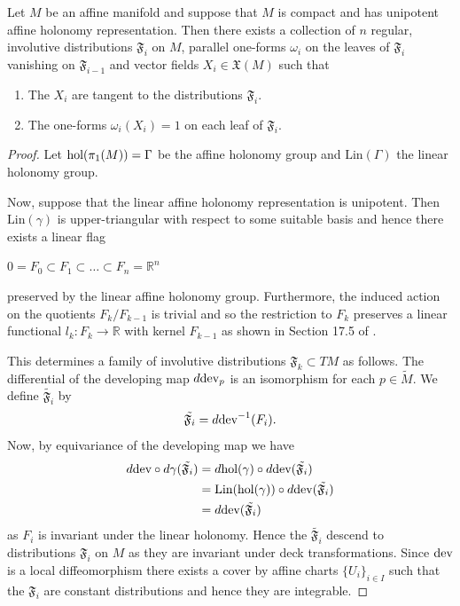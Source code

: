 \begin{prop}\label{prop:involutive-distr}
    Let $M$ be an affine manifold and suppose that $M$ is compact and has unipotent affine holonomy representation. Then there exists a collection of $n$ regular, involutive distributions
    $\mathfrak{F}_i$ on $M$, parallel one-forms $\omega_i$ on the leaves of $\mathfrak{F}_i$ vanishing on $\mathfrak{F}_{i-1}$ and vector fields $X_i \in \mathfrak{X}(M)$ such that
    \begin{enumerate}
        \item The $X_i$ are tangent to the distributions $\mathfrak{F}_i$.
        \item The one-forms $\omega_i(X_i) = 1$ on each leaf of $\mathfrak{F}_i$.
    \end{enumerate}
\end{prop}
\begin{proof}
    Let $\text{hol}(\pi_1(M)) = \Gamma$ be the affine holonomy group and $\text{Lin}(\Gamma)$ the linear holonomy group.

    Now, suppose that the linear affine holonomy representation is unipotent. Then
    $\text{Lin}(\gamma)$ is upper-triangular with respect to some suitable basis
    and hence there exists a linear flag
    \begin{center}
        $0 = F_0 \subset F_1 \subset \dots \subset F_n = \mathbb{R}^n$
    \end{center}
    preserved by the linear affine holonomy group. Furthermore, the induced action on the quotients $F_k/F_{k-1}$ is trivial and so
    the restriction to $F_k$ preserves a linear functional $l_k : F_k \to \mathbb{R}$ with kernel $F_{k-1}$ as shown in Section 17.5 of \cite{humphreys2012linear}  .

    This determines a family of involutive distributions $\mathfrak{F}_k \subset
        TM$ as follows. The differential of the developing map $d \text{dev}_p$ is an
    isomorphism for each $p \in \tilde{M}$. We define $\tilde{\mathfrak{F}_i}$ by
    $$ \tilde{\mathfrak{F}_i} = d\text{dev}^{-1}(F_i). $$ Now, by equivariance of the
    developing map we have
    \begin{align*}
        d \text{dev} \circ d\gamma (\tilde{\mathfrak{F}_i}) & = d\text{hol}(\gamma) \circ d \text{dev}(\tilde{\mathfrak{F}_i})            \\
                                                      & = \text{Lin}(\text{hol}(\gamma)) \circ d \text{dev}(\tilde{\mathfrak{F}_i}) \\
                                                      & =  d \text{dev}(\tilde{\mathfrak{F}_i})
    \end{align*}
    as $F_i$ is invariant under the linear holonomy. Hence the $\tilde{\mathfrak{F}_i}$ descend to distributions $\mathfrak{F}_i$ on $M$ as they are invariant
    under deck transformations. Since $\text{dev}$ is a local diffeomorphism there exists a cover by affine charts $\{U_i\}_{i \in I}$ such that the $\mathfrak{F}_i$ are constant distributions and hence they are integrable.


\end{proof}
